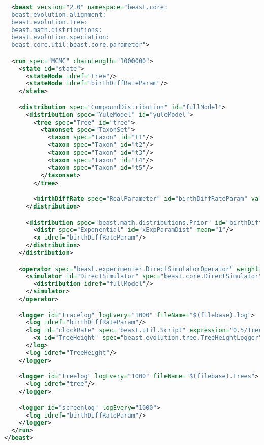\documentclass[oneside]{article}
\begin{document}
{\small
\singlespacing
\begin{lstlisting}[language=XML, caption=BEAST 2 control file for
  generating two distributions under the Yule model (one obtained by
  sampling through MCMC and the other with direct simulation)., label={lst:yuleunit}]
  
  <beast version="2.0" namespace="beast.core:
  beast.evolution.alignment:
  beast.evolution.tree:
  beast.math.distributions:
  beast.evolution.speciation:
  beast.core.util:beast.core.parameter">

  <run spec="MCMC" chainLength="1000000">
    <state id="state">
      <stateNode idref="tree"/>
      <stateNode idref="birthDiffRateParam"/>
    </state>

    <distribution spec="CompoundDistribution" id="fullModel">
      <distribution spec="YuleModel" id="yuleModel">
        <tree spec="Tree" id="tree">
          <taxonset spec="TaxonSet">
            <taxon spec="Taxon" id="t1"/>
            <taxon spec="Taxon" id="t2"/>
            <taxon spec="Taxon" id="t3"/>
            <taxon spec="Taxon" id="t4"/>
            <taxon spec="Taxon" id="t5"/>
          </taxonset>
        </tree>

        <birthDiffRate spec="RealParameter" id="birthDiffRateParam" value="1.0"/>
      </distribution>

      <distribution spec="beast.math.distributions.Prior" id="birthDiffRatePrior">
        <distr spec="Exponential" id="xExpParamDist" mean="1"/>
        <x idref="birthDiffRateParam"/>
      </distribution>
    </distribution>

    <operator spec="beast.experimenter.DirectSimulatorOperator" weight="1" state="@state">
      <simulator id="DirectSimulator" spec="beast.core.DirectSimulator" nSamples="1">
        <distribution idref="fullModel"/>
      </simulator>
    </operator>

    <logger id="tracelog" logEvery="1000" fileName="$(filebase).log">
      <log idref="birthDiffRateParam"/>
      <log id="clockRate" spec="beast.util.Script" expression="0.5/TreeHeight">
        <x id="TreeHeight" spec="beast.evolution.tree.TreeHeightLogger" tree="@tree"/>
      </log>
      <log idref="TreeHeight"/>
    </logger>

    <logger id="treelog" logEvery="1000" fileName="$(filebase).trees">
      <log idref="tree"/>
    </logger>

    <logger id="screenlog" logEvery="1000">
      <log idref="birthDiffRateParam"/>
    </logger>
  </run>
</beast>
\end{lstlisting}
}
\end{document}
